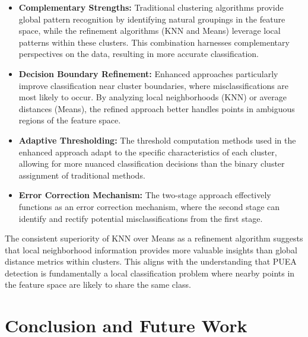 \begin{itemize}
    \item \textbf{Complementary Strengths:} Traditional clustering algorithms provide global pattern recognition by identifying natural groupings in the feature space, while the refinement algorithms (KNN and Means) leverage local patterns within these clusters. This combination harnesses complementary perspectives on the data, resulting in more accurate classification.
    
    \item \textbf{Decision Boundary Refinement:} Enhanced approaches particularly improve classification near cluster boundaries, where misclassifications are most likely to occur. By analyzing local neighborhoods (KNN) or average distances (Means), the refined approach better handles points in ambiguous regions of the feature space.
    
    \item \textbf{Adaptive Thresholding:} The threshold computation methods used in the enhanced approach adapt to the specific characteristics of each cluster, allowing for more nuanced classification decisions than the binary cluster assignment of traditional methods.
    
    \item \textbf{Error Correction Mechanism:} The two-stage approach effectively functions as an error correction mechanism, where the second stage can identify and rectify potential misclassifications from the first stage.
\end{itemize}

The consistent superiority of KNN over Means as a refinement algorithm suggests that local neighborhood information provides more valuable insights than global distance metrics within clusters. This aligns with the understanding that PUEA detection is fundamentally a local classification problem where nearby points in the feature space are likely to share the same class.



\chapter{Conclusion and Future Work}

